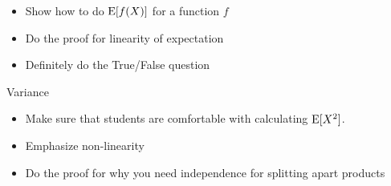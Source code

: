 \documentclass{exam}
\begin{document}
\begin{questions}
\begin{itemize}
\item Show how to do $\text{E}[f(X)]$ for a function $f$
\item Do the proof for linearity of expectation
\item Definitely do the True/False question
\end{itemize}
\item Variance
\begin{itemize}
\item Make sure that students are comfortable with calculating $\text{E}[X^2]$.
\item Emphasize non-linearity
\item Do the proof for why you need independence for splitting apart products
\end{itemize}
\end{questions}
\end{document}

